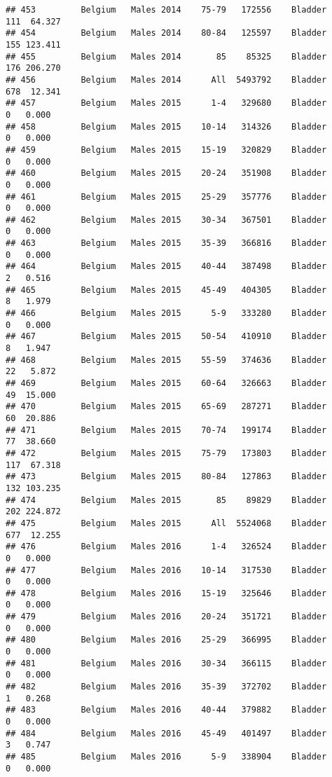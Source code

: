 \documentclass[
]{article}
\begin{document}
\begin{verbatim}
## 453         Belgium   Males 2014    75-79   172556    Bladder    111  64.327
## 454         Belgium   Males 2014    80-84   125597    Bladder    155 123.411
## 455         Belgium   Males 2014       85    85325    Bladder    176 206.270
## 456         Belgium   Males 2014      All  5493792    Bladder    678  12.341
## 457         Belgium   Males 2015      1-4   329680    Bladder      0   0.000
## 458         Belgium   Males 2015    10-14   314326    Bladder      0   0.000
## 459         Belgium   Males 2015    15-19   320829    Bladder      0   0.000
## 460         Belgium   Males 2015    20-24   351908    Bladder      0   0.000
## 461         Belgium   Males 2015    25-29   357776    Bladder      0   0.000
## 462         Belgium   Males 2015    30-34   367501    Bladder      0   0.000
## 463         Belgium   Males 2015    35-39   366816    Bladder      0   0.000
## 464         Belgium   Males 2015    40-44   387498    Bladder      2   0.516
## 465         Belgium   Males 2015    45-49   404305    Bladder      8   1.979
## 466         Belgium   Males 2015      5-9   333280    Bladder      0   0.000
## 467         Belgium   Males 2015    50-54   410910    Bladder      8   1.947
## 468         Belgium   Males 2015    55-59   374636    Bladder     22   5.872
## 469         Belgium   Males 2015    60-64   326663    Bladder     49  15.000
## 470         Belgium   Males 2015    65-69   287271    Bladder     60  20.886
## 471         Belgium   Males 2015    70-74   199174    Bladder     77  38.660
## 472         Belgium   Males 2015    75-79   173803    Bladder    117  67.318
## 473         Belgium   Males 2015    80-84   127863    Bladder    132 103.235
## 474         Belgium   Males 2015       85    89829    Bladder    202 224.872
## 475         Belgium   Males 2015      All  5524068    Bladder    677  12.255
## 476         Belgium   Males 2016      1-4   326524    Bladder      0   0.000
## 477         Belgium   Males 2016    10-14   317530    Bladder      0   0.000
## 478         Belgium   Males 2016    15-19   325646    Bladder      0   0.000
## 479         Belgium   Males 2016    20-24   351721    Bladder      0   0.000
## 480         Belgium   Males 2016    25-29   366995    Bladder      0   0.000
## 481         Belgium   Males 2016    30-34   366115    Bladder      0   0.000
## 482         Belgium   Males 2016    35-39   372702    Bladder      1   0.268
## 483         Belgium   Males 2016    40-44   379882    Bladder      0   0.000
## 484         Belgium   Males 2016    45-49   401497    Bladder      3   0.747
## 485         Belgium   Males 2016      5-9   338904    Bladder      0   0.000

\end{verbatim}
\end{document}
